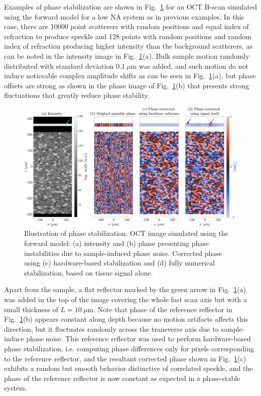 Examples of phase stabilization are shown in Fig.~\ref{fig:PhaseStabilization} for an OCT B-scan simulated using the forward model for a low NA system as in previous examples. In this case, there are 10000 point scatterers with random positions and equal index of refraction to produce speckle and 128 points with random positions and random index of refraction producing higher intensity than the background scatterers, as can be noted in the intensity image in Fig.~\ref{fig:PhaseStabilization}(a). Bulk sample motion randomly distributed with standard deviation $0.1~\mu$m was added, and such motion do not induce noticeable complex amplitude shifts as can be seen in Fig.~\ref{fig:PhaseStabilization}(a), but phase offsets are strong as shown in the phase image of Fig.~\ref{fig:PhaseStabilization}(b) that presents strong fluctuations that greatly reduce phase stability.

\begin{figure}[htb!]
	\centering
	\includegraphics[width=\textwidth]{Figures/TheoreticalBasis/PhaseStabilizationComp.pdf}
	\caption[Illustration of phase stabilization.]{Illustration of phase stabilization. OCT image simulated using the forward model: (a) intensity and (b) phase presenting phase instabilities due to sample-induced phase noise. Corrected phase using (c) hardware-based stabilization and (d) fully numerical stabilization, based on tissue signal alone.}\label{fig:PhaseStabilization}
\end{figure}

Apart from the sample, a flat reflector marked by the green arrow in Fig.~\ref{fig:PhaseStabilization}(a) was added in the top of the image covering the whole fast scan axis but with a small thickness of $L=10~\mu$m. Note that phase of the reference reflector in Fig.~\ref{fig:PhaseStabilization}(b) appears constant along depth because no motion artifacts affects this direction, but it fluctuates randomly across the transverse axis due to sample-induce phase noise. This reference reflector was used to perform hardware-based phase stabilization, i.e.  computing phase differences only for pixels corresponding to the reference reflector, and the resultant corrected phase shown in Fig.~\ref{fig:PhaseStabilization}(c) exhibits a random but smooth behavior distinctive of correlated speckle, and the phase of the reference reflector is now constant as expected in a phase-stable system.

